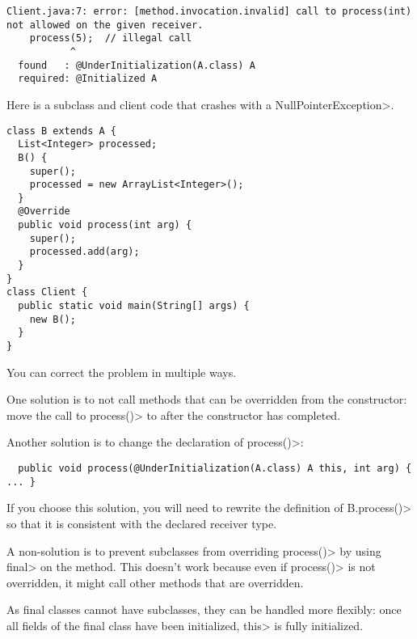 \begin{Verbatim}
Client.java:7: error: [method.invocation.invalid] call to process(int) not allowed on the given receiver.
    process(5);  // illegal call
           ^
  found   : @UnderInitialization(A.class) A
  required: @Initialized A
\end{Verbatim}

Here is a subclass and client code that crashes with a \<NullPointerException>.

\begin{Verbatim}
class B extends A {
  List<Integer> processed;
  B() {
    super();
    processed = new ArrayList<Integer>();
  }
  @Override
  public void process(int arg) {
    super();
    processed.add(arg);
  }
}
class Client {
  public static void main(String[] args) {
    new B();
  }
}
\end{Verbatim}

You can correct the problem in multiple ways.

One solution is to not call methods that can be overridden from the
constructor:  move the call to \<process()> to after the constructor has
completed.

Another solution is to change the declaration of \<process()>:

\begin{Verbatim}
  public void process(@UnderInitialization(A.class) A this, int arg) { ... }
\end{Verbatim}

If you choose this solution, you will need to rewrite the definition of
\<B.process()> so that it is consistent with the declared receiver type.

A non-solution is to prevent subclasses from overriding \<process()> by
using \<final> on the method.  This doesn't work because even if
\<process()> is not overridden, it might call other methods that are
overridden.

As final classes cannot have subclasses, they can be handled more
flexibly: once all fields of the final class have been
initialized, \<this> is fully initialized.





